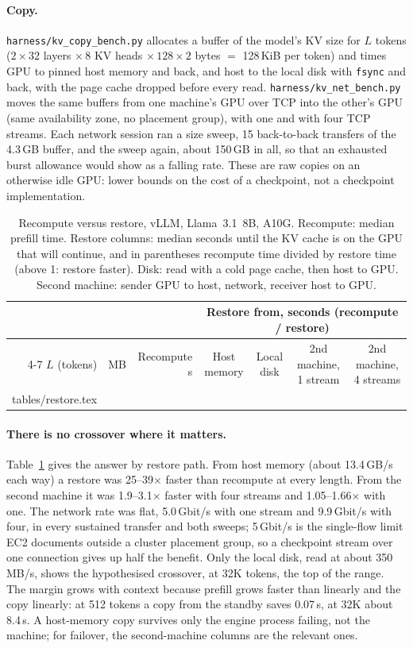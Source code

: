 \documentclass[10pt,twocolumn]{article}
\makeatletter
\def\RestoreRows{\@@input tables/restore.tex }
\makeatother
\begin{document}
\paragraph{Copy.} \texttt{harness/kv\_copy\_bench.py} allocates a buffer of
the model's KV size for $L$ tokens ($2\times32$ layers $\times\,8$ KV heads
$\times\,128\times2$ bytes $=$ 128\,KiB per token) and times GPU to pinned
host memory and back, and host to the local disk with \texttt{fsync} and
back, with the page cache dropped before every read.
\texttt{harness/kv\_net\_bench.py} moves the same buffers from one machine's
GPU over TCP into the other's GPU (same availability zone, no placement
group), with one and with four TCP streams. Each network session ran a size
sweep, 15 back-to-back transfers of the 4.3\,GB buffer, and the sweep again,
about 150\,GB in all, so that an exhausted burst allowance would show as a
falling rate. These are raw copies on an otherwise idle GPU: lower bounds on
the cost of a checkpoint, not a checkpoint implementation.

\begin{table}[t]
\centering\small
\caption{Recompute versus restore, vLLM, Llama~3.1~8B, A10G. Recompute:
median prefill time. Restore columns: median seconds until the KV cache is on
the GPU that will continue, and in parentheses recompute time divided by
restore time (above 1: restore faster). Disk: read with a cold page cache,
then host to GPU. Second machine: sender GPU to host, network, receiver host
to GPU.}
\label{tab:restore}
\begin{tabular}{@{}rrrcccc@{}}
\toprule
 & & & \multicolumn{4}{c}{Restore from, seconds (recompute / restore)} \\
\cmidrule(l){4-7}
$L$ (tokens) & MB & Recompute s & Host memory & Local disk & 2nd machine, 1 stream & 2nd machine, 4 streams \\
\midrule
\RestoreRows
\bottomrule
\end{tabular}
\end{table}

\paragraph{There is no crossover where it matters.} Table~\ref{tab:restore}
gives the answer by restore path. From host memory (about 13.4\,GB/s each
way) a restore was 25--39$\times$ faster than recompute at every length. From
the second machine it was 1.9--3.1$\times$ faster with four streams and
1.05--1.66$\times$ with one. The network rate was flat, 5.0\,Gbit/s with one
stream and 9.9\,Gbit/s with four, in every sustained transfer and both
sweeps; 5\,Gbit/s is the single-flow limit EC2 documents outside a cluster
placement group, so a checkpoint stream over one connection gives up half the
benefit. Only the local disk, read at about 350\,MB/s, shows the hypothesised
crossover, at 32K tokens, the top of the range. The margin grows with
context because prefill grows faster than linearly and the copy linearly: at
512 tokens a copy from the standby saves 0.07\,s, at 32K about 8.4\,s.
A host-memory copy survives only the engine process failing, not the
machine; for failover, the second-machine columns are the relevant ones.
\end{document}
